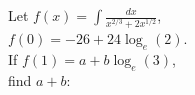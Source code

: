 \documentclass[preview]{standalone}
\begin{document}
\begin{center}
Let $f(x) = \int \frac{dx}{x^{2/3} + 2x^{1/2}}$, \\ $f(0) = -26 + 24\log_e(2)$. \\ If $f(1) = a + b\log_e(3)$, \\ find $a+b$:
\end{center}
\end{document}

